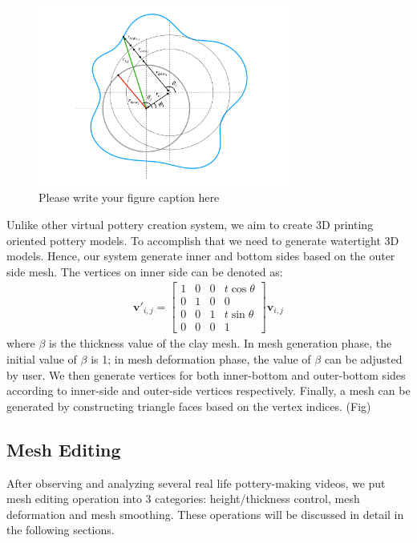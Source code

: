 \begin{figure}
  \includegraphics[width=0.75\textwidth]{f2.pdf}
\caption{Please write your figure caption here}
\label{fig:1}       %
\end{figure}

Unlike other virtual pottery creation system, we aim to create 3D printing oriented pottery models. To accomplish that we need to generate watertight 3D models. Hence, our system generate inner and bottom sides based on the outer side mesh. The vertices on inner side can be denoted as:
\begin{equation}
\begin{split}
\mathbf{v'}_{i,j} = 
\begin{bmatrix}
1 & 0 & 0 & t\cos\theta \\
0 & 1 & 0 & 0\\ 
0 & 0 & 1 & t\sin\theta \\
0 & 0 & 0 & 1 
\end{bmatrix}
\mathbf{v}_{i,j}
\end{split}
\end{equation}
where $\beta$ is the thickness value of the clay mesh. In mesh generation phase, the initial value of $\beta$ is 1; in mesh deformation phase, the value of $\beta$ can be adjusted by user.
We then generate vertices for both inner-bottom and outer-bottom sides according to inner-side and outer-side vertices respectively. Finally, a mesh can be generated by constructing triangle faces based on the vertex indices. (Fig)


\subsection{Mesh Editing}
\label{sec:4.2}
After observing and analyzing several real life pottery-making videos, we put mesh editing operation into 3 categories: height/thickness control, mesh deformation and mesh smoothing. These operations will be discussed in detail in the following sections.

